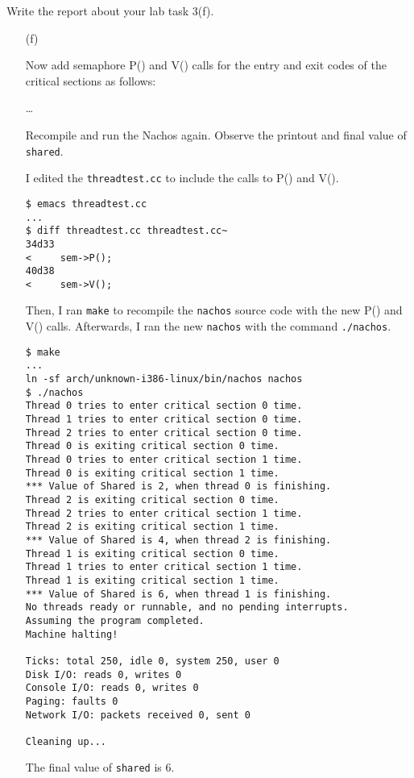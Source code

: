 \documentclass[11pt]{article}
\begin{document}
    \begin{question}
        Write the report about your lab task 3(f).
        \begin{itemize}
            \item[(f)]{Now add semaphore P() and V() calls for the entry and exit codes of the critical sections as follows:

            \ldots

            Recompile and run the Nachos again. Observe the printout and final value of {\tt shared}.

            I edited the {\tt threadtest.cc} to include the calls to P() and V().

            \begin{verbatim}
$ emacs threadtest.cc
...
$ diff threadtest.cc threadtest.cc~
34d33
<     sem->P();
40d38
<     sem->V();
            \end{verbatim}

            Then, I ran {\tt make} to recompile the {\tt nachos} source code with the new P() and V() calls. Afterwards, I ran the new {\tt nachos} with the command {\tt ./nachos}.

            \begin{verbatim}
$ make
...
ln -sf arch/unknown-i386-linux/bin/nachos nachos
$ ./nachos
Thread 0 tries to enter critical section 0 time.
Thread 1 tries to enter critical section 0 time.
Thread 2 tries to enter critical section 0 time.
Thread 0 is exiting critical section 0 time.
Thread 0 tries to enter critical section 1 time.
Thread 0 is exiting critical section 1 time.
*** Value of Shared is 2, when thread 0 is finishing.
Thread 2 is exiting critical section 0 time.
Thread 2 tries to enter critical section 1 time.
Thread 2 is exiting critical section 1 time.
*** Value of Shared is 4, when thread 2 is finishing.
Thread 1 is exiting critical section 0 time.
Thread 1 tries to enter critical section 1 time.
Thread 1 is exiting critical section 1 time.
*** Value of Shared is 6, when thread 1 is finishing.
No threads ready or runnable, and no pending interrupts.
Assuming the program completed.
Machine halting!

Ticks: total 250, idle 0, system 250, user 0
Disk I/O: reads 0, writes 0
Console I/O: reads 0, writes 0
Paging: faults 0
Network I/O: packets received 0, sent 0

Cleaning up...
            \end{verbatim}

            The final value of {\tt shared} is 6.

            }
        \end{itemize}

    \end{question}
\end{document}
